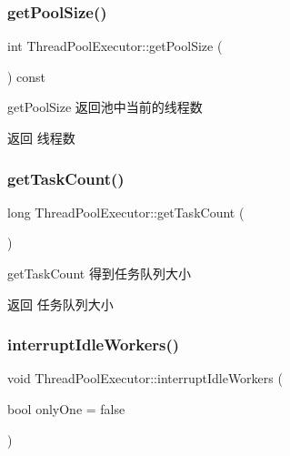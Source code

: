 \subsubsection{\texorpdfstring{get\+Pool\+Size()}{getPoolSize()}}
{\footnotesize\ttfamily int Thread\+Pool\+Executor\+::get\+Pool\+Size (\begin{DoxyParamCaption}{ }\end{DoxyParamCaption}) const}



get\+Pool\+Size 返回池中当前的线程数 

\begin{DoxyReturn}{返回}
线程数 
\end{DoxyReturn}
\mbox{\label{classThreadPoolExecutor_a50b63440d1d93f3c5c19082ca538edb6}} 
\subsubsection{\texorpdfstring{get\+Task\+Count()}{getTaskCount()}}
{\footnotesize\ttfamily long Thread\+Pool\+Executor\+::get\+Task\+Count (\begin{DoxyParamCaption}{ }\end{DoxyParamCaption})}



get\+Task\+Count 得到任务队列大小 

\begin{DoxyReturn}{返回}
任务队列大小 
\end{DoxyReturn}
\mbox{\label{classThreadPoolExecutor_a83bf8bbd11a4dfe12b843dac846a825d}} 
\subsubsection{\texorpdfstring{interrupt\+Idle\+Workers()}{interruptIdleWorkers()}}
{\footnotesize\ttfamily void Thread\+Pool\+Executor\+::interrupt\+Idle\+Workers (\begin{DoxyParamCaption}\item[{bool}]{only\+One = {\ttfamily false} }\end{DoxyParamCaption})}




